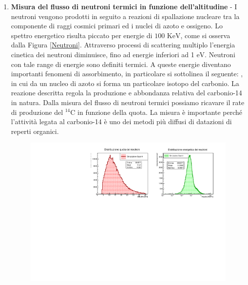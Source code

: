 \begin{enumerate}
    Le precedenti misure di flusso assumono maggiore interesse se integrate con informazioni quali pressione atmosferica, umidità, tempo di arrivo e coordinate GPS; queste ultime in particolare permettono di correlare eventi in quota con eventi a terra, rivelabili con telescopi per raggi cosmici gi\'a presenti nel dipartimento di Fisica: in questo modo si potrebbero identificare eventi rari di \emph{sciami estesi} \footnote{particelle prodotte da una singola interazione di un raggio cosmico primario con l'atmosfera che coprono una vasta superficie geografica.} (figura \ref{fig:sciami}). 
    \item \textbf{Misura del flusso di neutroni termici in funzione dell'altitudine} - I neutroni vengono prodotti in seguito a reazioni di spallazione nucleare tra la componente di raggi cosmici primari ed i nuclei di azoto e ossigeno. Lo spettro energetico risulta piccato per energie di $100\text{ KeV}$, come si osserva dalla Figura \ref{Neutroni}. Attraverso processi di scattering multiplo l'energia cinetica dei neutroni diminuisce, fino ad energie inferiori ad 1 $\text{eV}$. Neutroni con tale range di energie sono definiti termici. A queste energie diventano importanti fenomeni di assorbimento, in particolare si sottolinea il seguente:
, in cui da un nucleo di azoto si forma un particolare isotopo del carbonio. La reazione descritta regola la produzione e abbondanza relativa del carbonio-14 in natura. Dalla misura del flusso di neutroni termici possiamo ricavare il rate di produzione del $^{14}\text{C}$ in funzione della quota.
La misura è importante perché l'attività legata al carbonio-14 è uno dei metodi più diffusi di datazioni di reperti organici. 
\begin{figure}
    \centering
    \includegraphics[width=.9\linewidth]{Neutroni.pdf}

\end{figure}
\end{enumerate}

